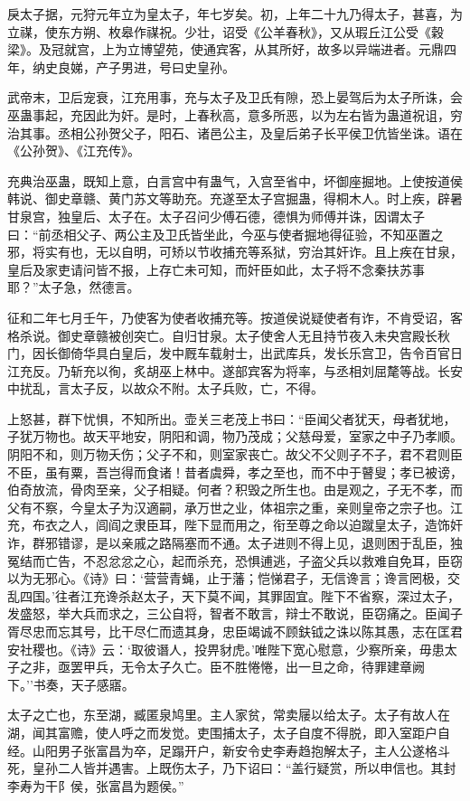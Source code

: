 \documentclass[]{article}
\begin{document}
戾太子据，元狩元年立为皇太子，年七岁矣。初，上年二十九乃得太子，甚喜，为立禖，使东方朔、枚皋作禖祝。少壮，诏受《公羊春秋》，又从瑕丘江公受《穀梁》。及冠就宫，上为立博望苑，使通宾客，从其所好，故多以异端进者。元鼎四年，纳史良娣，产子男进，号曰史皇孙。

武帝末，卫后宠衰，江充用事，充与太子及卫氏有隙，恐上晏驾后为太子所诛，会巫蛊事起，充因此为奸。是时，上春秋高，意多所恶，以为左右皆为蛊道祝诅，穷治其事。丞相公孙贺父子，阳石、诸邑公主，及皇后弟子长平侯卫伉皆坐诛。语在《公孙贺》、《江充传》。

充典治巫蛊，既知上意，白言宫中有蛊气，入宫至省中，坏御座掘地。上使按道侯韩说、御史章赣、黄门苏文等助充。充遂至太子宫掘蛊，得桐木人。时上疾，辟暑甘泉宫，独皇后、太子在。太子召问少傅石德，德惧为师傅并诛，因谓太子曰：``前丞相父子、两公主及卫氏皆坐此，今巫与使者掘地得征验，不知巫置之邪，将实有也，无以自明，可矫以节收捕充等系狱，穷治其奸诈。且上疾在甘泉，皇后及家吏请问皆不报，上存亡未可知，而奸臣如此，太子将不念秦扶苏事耶？''太子急，然德言。

征和二年七月壬午，乃使客为使者收捕充等。按道侯说疑使者有诈，不肯受诏，客格杀说。御史章赣被创突亡。自归甘泉。太子使舍人无且持节夜入未央宫殿长秋门，因长御倚华具白皇后，发中厩车载射士，出武库兵，发长乐宫卫，告令百官日江充反。乃斩充以徇，炙胡巫上林中。遂部宾客为将率，与丞相刘屈氂等战。长安中扰乱，言太子反，以故众不附。太子兵败，亡，不得。

上怒甚，群下忧惧，不知所出。壶关三老茂上书曰：``臣闻父者犹天，母者犹地，子犹万物也。故天平地安，阴阳和调，物乃茂成；父慈母爱，室家之中子乃孝顺。阴阳不和，则万物夭伤；父子不和，则室家丧亡。故父不父则子不子，君不君则臣不臣，虽有粟，吾岂得而食诸！昔者虞舜，孝之至也，而不中于瞽叟；孝已被谤，伯奇放流，骨肉至亲，父子相疑。何者？积毁之所生也。由是观之，子无不孝，而父有不察，今皇太子为汉適嗣，承万世之业，体祖宗之重，亲则皇帝之宗子也。江充，布衣之人，闾阎之隶臣耳，陛下显而用之，衔至尊之命以迫蹴皇太子，造饰奸诈，群邪错谬，是以亲戚之路隔塞而不通。太子进则不得上见，退则困于乱臣，独冤结而亡告，不忍忿忿之心，起而杀充，恐惧逋逃，子盗父兵以救难自免耳，臣窃以为无邪心。《诗》曰：`营营青蝇，止于藩；恺悌君子，无信谗言；谗言罔极，交乱四国。'往者江充谗杀赵太子，天下莫不闻，其罪固宜。陛下不省察，深过太子，发盛怒，举大兵而求之，三公自将，智者不敢言，辩士不敢说，臣窃痛之。臣闻子胥尽忠而忘其号，比干尽仁而遗其身，忠臣竭诚不顾鈇钺之诛以陈其愚，志在匡君安社稷也。《诗》云：`取彼谮人，投畀豺虎。'唯陛下宽心慰意，少察所亲，毋患太子之非，亟罢甲兵，无令太子久亡。臣不胜惓惓，出一旦之命，待罪建章阙下。''书奏，天子感寤。

太子之亡也，东至湖，臧匿泉鸠里。主人家贫，常卖屦以给太子。太子有故人在湖，闻其富赡，使人呼之而发觉。吏围捕太子，太子自度不得脱，即入室距户自经。山阳男子张富昌为卒，足蹋开户，新安令史李寿趋抱解太子，主人公遂格斗死，皇孙二人皆并遇害。上既伤太子，乃下诏曰：``盖行疑赏，所以申信也。其封李寿为干阝侯，张富昌为题侯。''
\end{document}
